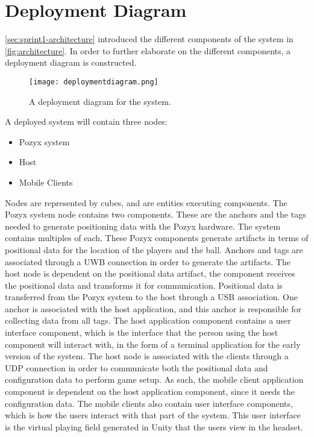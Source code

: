\section{Deployment Diagram}\label{sec:sprint2-deploymentdia}
\autoref{sec:sprint1-architecture} introduced the different components of the system in \autoref{fig:architecture}.
In order to further elaborate on the different components, a deployment diagram is constructed.
\begin{figure}[H]
    \centering
    \texttt{[image: deploymentdiagram.png]}
    \caption{A deployment diagram for the system.}
    \label{fig:sprint2-deployment}
\end{figure}
\noindent
A deployed system will contain three nodes:
\begin{itemize}
    \item Pozyx system
    \item Host
    \item Mobile Clients
\end{itemize}
Nodes are represented by cubes, and are entities executing components.
The Pozyx system node contains two components.
These are the anchors and the tags needed to generate positioning data with the Pozyx hardware.
The system contains multiples of each.
These Pozyx components generate artifacts in terms of positional data for the location of the players and the ball.
Anchors and tags are associated through a UWB connection in order to generate the artifacts.
The host node is dependent on the positional data artifact, the component receives the positional data and transforms it for communication.
Positional data is transferred from the Pozyx system to the host through a USB association.
One anchor is associated with the host application, and this anchor is responsible for collecting data from all tags.
The host application component contains a user interface component, which is the interface that the person using the host component will interact with, in the form of a terminal application for the early version of the system.
The host node is associated with the clients through a UDP connection in order to communicate both the positional data and configuration data to perform game setup.
As such, the mobile client application component is dependent on the host application component, since it needs the configuration data.
The mobile clients also contain user interface components, which is how the users interact with that part of the system.
This user interface is the virtual playing field generated in Unity that the users view in the headset.
